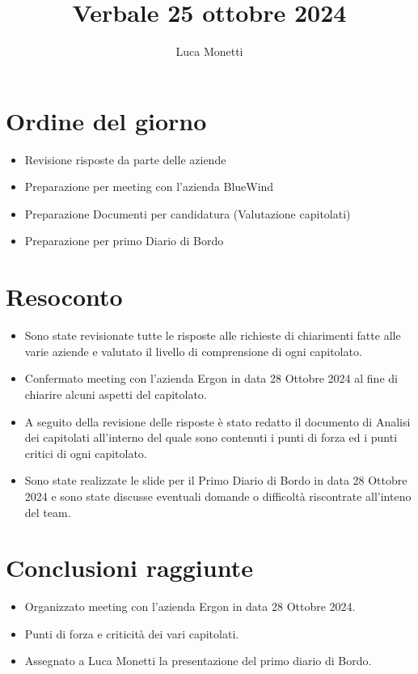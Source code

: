 \documentclass{TWReport}
\title{Verbale 25 ottobre 2024}
\author{Luca Monetti}
\begin{document}
\frontmatter

\showPartecipants

\section*{Ordine del giorno}
\begin{itemize}
    \item Revisione risposte da parte delle aziende
    \item Preparazione per meeting con l'azienda BlueWind
    \item Preparazione Documenti per candidatura (Valutazione capitolati)
    \item Preparazione per primo Diario di Bordo
\end{itemize}

\section*{Resoconto}
\begin{itemize}
    \item Sono state revisionate tutte le risposte alle richieste di chiarimenti fatte alle varie aziende e valutato il livello di comprensione di ogni capitolato.
    \item Confermato meeting con l'azienda Ergon in data 28 Ottobre 2024 al fine di chiarire alcuni aspetti del capitolato.
    \item A seguito della revisione delle risposte è stato redatto il documento di Analisi dei capitolati all'interno del quale sono contenuti i punti di forza ed i punti critici di ogni capitolato.
    \item Sono state realizzate le slide per il Primo Diario di Bordo in data 28 Ottobre 2024 e sono state discusse eventuali domande o difficoltà riscontrate all'inteno del team.
\end{itemize}

\section*{Conclusioni raggiunte}
\begin{itemize}
    \item Organizzato meeting con l'azienda Ergon in data 28 Ottobre 2024.
    \item Punti di forza e criticità dei vari capitolati.
    \item Assegnato a Luca Monetti la presentazione del primo diario di Bordo.
\end{itemize}


\tasklist
\end{document}
